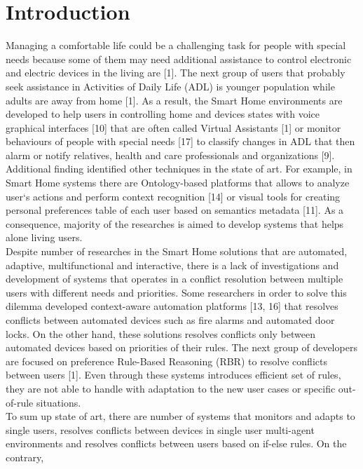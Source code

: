 \documentclass{llncs}
\begin{document}
    \section{Introduction}
    Managing a comfortable life could be a challenging task for people with special needs because some of them may need additional
    assistance to control electronic and electric devices in the living are [1]. The next group of users that probably seek
    assistance in Activities of Daily Life (ADL) is younger population while adults are away from home [1]. As a result,
    the Smart Home environments are developed to help users in controlling home and devices states with voice graphical
    interfaces [10] that are often called Virtual Assistants [1] or monitor behaviours of people
    with special needs [17] to classify changes in ADL that then alarm or notify relatives, health and care professionals
    and organizations [9]. Additional finding identified other techniques in the state of art.
    For example, in Smart Home systems there are Ontology-based platforms that allows to analyze user`s actions and
    perform context recognition [14] or visual tools for creating personal preferences table of each user based on semantics
    metadata [11]. As a consequence, majority of the researches is aimed to develop systems that helps alone living users.
    \\Despite number of
    researches in the Smart Home solutions that are automated, adaptive, multifunctional and interactive, there is a lack of
    investigations and development of systems that operates in a conflict resolution between multiple users with different
    needs and priorities. Some researchers in order to solve this dilemma developed context-aware automation platforms
    [13, 16] that resolves conflicts between automated devices such as fire alarms and automated door locks.
    On the other hand, these solutions resolves conflicts only between automated devices based on priorities of their rules.
    The next group of
    developers are focused on preference Rule-Based Reasoning (RBR) to resolve conflicts between users [1]. Even through
    these systems introduces efficient set of rules, they are not able to handle with adaptation to the new user cases or
    specific out-of-rule situations. \\To sum up
    state of art, there are number of systems that monitors and adapts to single users, resolves conflicts between devices
    in single user multi-agent environments and resolves conflicts between users based on if-else rules. On the contrary,
\end{document}
